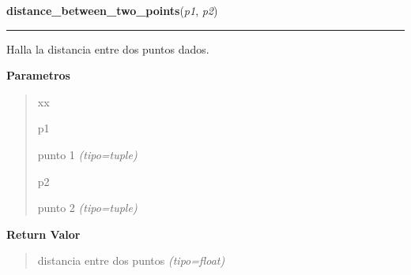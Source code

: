 \hspace{.8\funcindent}\begin{boxedminipage}{\funcwidth}

    \raggedright \textbf{distance\_between\_two\_points}(\textit{p1}, \textit{p2})

    \vspace{-1.5ex}

    \rule{\textwidth}{0.5\fboxrule}
\setlength{\parskip}{2ex}
Halla la distancia entre dos puntos dados.

\setlength{\parskip}{1ex}
      \textbf{Parametros}
      \vspace{-1ex}

      \begin{quote}
        \begin{Ventry}{xx}

          \item[p1]


punto 1
            {\it (tipo=tuple)}

          \item[p2]


punto 2
            {\it (tipo=tuple)}

        \end{Ventry}

      \end{quote}

      \textbf{Return Valor}
    \vspace{-1ex}

      \begin{quote}

distancia entre dos puntos
      {\it (tipo=float)}

      \end{quote}

    \end{boxedminipage}

    \label{src:functions:direction_between_two_points}

    \vspace{0.5ex}

